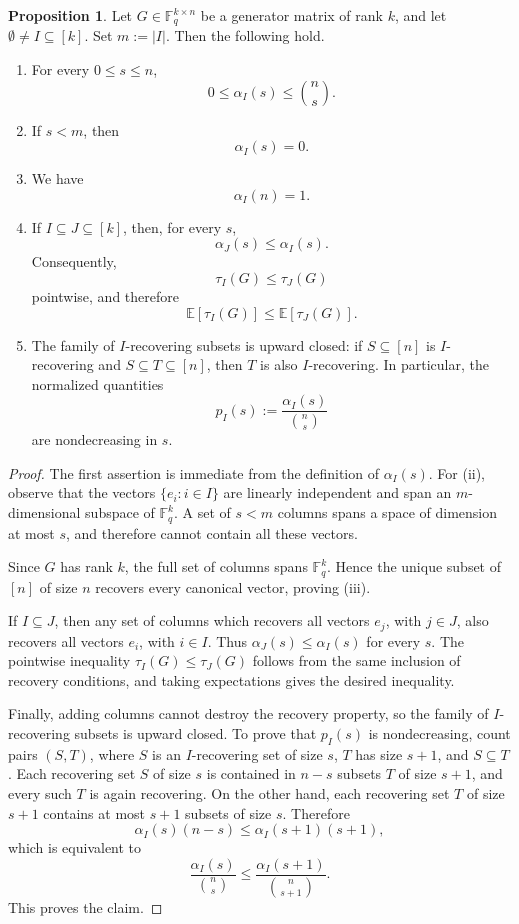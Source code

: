 \documentclass[11pt,a4paper]{article}
\numberwithin{equation}{section}
\theoremstyle{definition}
\theoremstyle{definition}
\newtheorem{proposition}[definition]{Proposition}
\newcommand{\F}{\mathbb{F}}
\newcommand{\E}{\mathbb{E}}
\begin{document}
\begin{proposition}\label{prop:alpha-properties}
Let $G\in \F_q^{k\times n}$ be a generator matrix of rank $k$, and let
$\emptyset\neq I\subseteq [k]$.  Set $m:=|I|$.  Then the following hold.
\begin{enumerate}[label=\textnormal{(\roman*)}]
\item For every $0\leq s\leq n$,
\[
0\leq \alpha_I(s)\leq \binom ns.
\]

\item If $s<m$, then
\[
\alpha_I(s)=0.
\]

\item We have
\[
\alpha_I(n)=1.
\]

\item If $I\subseteq J\subseteq [k]$, then, for every $s$,
\[
\alpha_J(s)\leq \alpha_I(s).
\]
Consequently,
\[
\tau_I(G)\leq \tau_J(G)
\]
pointwise, and therefore
\[
\E[\tau_I(G)]\leq \E[\tau_J(G)].
\]

\item The family of $I$-recovering subsets is upward closed: if
$S\subseteq [n]$ is $I$-recovering and $S\subseteq T\subseteq [n]$, then
$T$ is also $I$-recovering.  In particular, the normalized quantities
\[
p_I(s):=\frac{\alpha_I(s)}{\binom ns}
\]
are nondecreasing in $s$.
\end{enumerate}
\end{proposition}

\begin{proof}
The first assertion is immediate from the definition of $\alpha_I(s)$.  For
(ii), observe that the vectors $\{e_i:i\in I\}$ are linearly independent and
span an $m$-dimensional subspace of $\F_q^k$.  A set of $s<m$ columns
spans a space of dimension at most $s$, and therefore cannot contain all
these vectors.

Since $G$ has rank $k$, the full set of columns spans $\F_q^k$.  Hence
the unique subset of $[n]$ of size $n$ recovers every canonical vector,
proving (iii).

If $I\subseteq J$, then any set of columns which recovers all vectors
$e_j$, with $j\in J$, also recovers all vectors $e_i$, with $i\in I$.
Thus $\alpha_J(s)\leq \alpha_I(s)$ for every $s$.  The pointwise inequality
$\tau_I(G)\leq \tau_J(G)$ follows from the same inclusion of recovery
conditions, and taking expectations gives the desired inequality.

Finally, adding columns cannot destroy the recovery property, so the family
of $I$-recovering subsets is upward closed.  To prove that $p_I(s)$ is
nondecreasing, count pairs $(S,T)$, where $S$ is an $I$-recovering set
of size $s$, $T$ has size $s+1$, and $S\subseteq T$.  Each recovering
set $S$ of size $s$ is contained in $n-s$ subsets $T$ of size $s+1$,
and every such $T$ is again recovering.  On the other hand, each recovering
set $T$ of size $s+1$ contains at most $s+1$ subsets of size $s$.
Therefore
\[
\alpha_I(s)(n-s)\leq \alpha_I(s+1)(s+1),
\]
which is equivalent to
\[
\frac{\alpha_I(s)}{\binom ns}
\leq
\frac{\alpha_I(s+1)}{\binom n{s+1}}.
\]
This proves the claim.
\end{proof}
\end{document}
